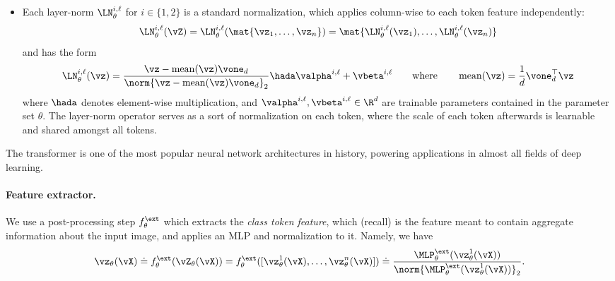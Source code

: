 \documentclass[../../book-main.tex]{subfiles}
\begin{document}
\begin{itemize}
    \begin{equation}
        \MLP_{\theta}^{\ell}(\vZ) \doteq \vW_{\down}^{\ell}\ReLU(\vW_{\up}^{\ell}\vZ + \vb_{\up}^{\ell}\vone_{n}^{\top}) + \vb_{\down}^{\ell}\vone_{n}^{\top}
    \end{equation}
    where \(\vW_{\up}^{\ell} \in \R^{q \times d}, \vW_{\down}^{\ell} \in \R^{d \times q}, \vb_{\up}^{\ell} \in \R^{q}, \vb_{\down}^{\ell} \in \R^{d}\) are trainable parameters also contained in the parameter set \(\theta\), and \(\ReLU\) is the element-wise ReLU nonlinearity, i.e., \(\ReLU(\vM)_{ij} = \max\{M_{ij}, 0\}\). 
    \item Each layer-norm \(\LN_{\theta}^{i, \ell}\) for \(i \in \{1, 2\}\) is a standard normalization, which applies column-wise to each token feature independently:
    \begin{equation}
        \LN_{\theta}^{i, \ell}(\vZ) = \LN_{\theta}^{i, \ell}(\mat{\vz_{1}, \dots, \vz_{n}}) = \mat{\LN_{\theta}^{i, \ell}(\vz_{1}), \dots, \LN_{\theta}^{i, \ell}(\vz_{n})}
    \end{equation}
    and has the form 
    \begin{equation}
        \LN_{\theta}^{i, \ell}(\vz) = \frac{\vz
        - \operatorname{mean}(\vz)\vone_{d}}{\norm{\vz
        - \operatorname{mean}(\vz)\vone_{d}}_{2}} \hada \valpha^{i, \ell} + \vbeta^{i, \ell} \qquad \text{where} \qquad \operatorname{mean}(\vz) = \frac{1}{d}\vone_{d}^{\top}\vz
    \end{equation}
    where \(\hada\) denotes element-wise multiplication, and \(\valpha^{i, \ell}, \vbeta^{i, \ell} \in \R^{d}\) are trainable parameters contained in the parameter set \(\theta\). The layer-norm operator serves as a sort of normalization on each token, where the scale of each token afterwards is learnable and shared amongst all tokens. 
\end{itemize}

The transformer is one of the most popular neural network architectures in history, powering applications in almost all fields of deep learning. 

\paragraph{Feature extractor.} We use a post-processing step \(f_{\theta}^{\ext}\) which extracts the \textit{class token feature}, which (recall) is the feature meant to contain aggregate information about the input image, and applies an MLP and normalization to it. Namely, we have 
\begin{equation}
    \vz_{\theta}(\vX) \doteq f_{\theta}^{\ext}(\vZ_{\theta}(\vX)) = f_{\theta}^{\ext}([\vz_{\theta}^{1}(\vX), \dots, \vz_{\theta}^{n}(\vX)]) \doteq \frac{\MLP_{\theta}^{\ext}(\vz_{\theta}^{1}(\vX))}{\norm{\MLP_{\theta}^{\ext}(\vz_{\theta}^{1}(\vX))}_{2}}.
\end{equation} 
\end{document}
